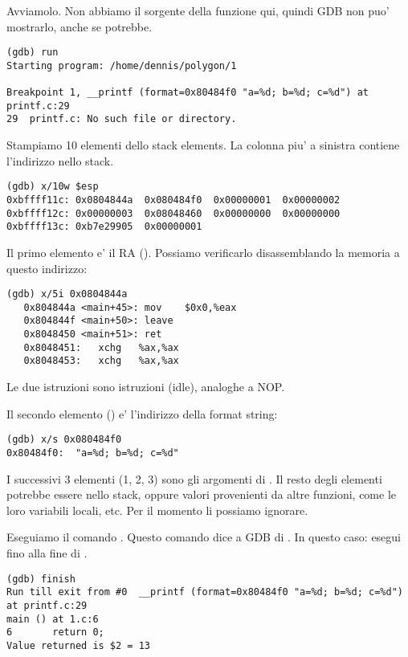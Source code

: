 Avviamolo.
Non abbiamo il sorgente della funzione \printf qui, quindi \ac{GDB} non puo' mostrarlo, anche se potrebbe.

\begin{lstlisting}
(gdb) run
Starting program: /home/dennis/polygon/1 

Breakpoint 1, __printf (format=0x80484f0 "a=%d; b=%d; c=%d") at printf.c:29
29	printf.c: No such file or directory.
\end{lstlisting}

Stampiamo 10 elementi dello stack elements. La colonna piu' a sinistra contiene l'indirizzo nello stack.

\begin{lstlisting}
(gdb) x/10w $esp
0xbffff11c:	0x0804844a	0x080484f0	0x00000001	0x00000002
0xbffff12c:	0x00000003	0x08048460	0x00000000	0x00000000
0xbffff13c:	0xb7e29905	0x00000001
\end{lstlisting}

Il primo elemento e' il \ac{RA} ().
Possiamo verificarlo disassemblando la memoria a questo indirizzo:

\begin{lstlisting}[label=NOP_as_XCHG_example,style=customasmx86]
(gdb) x/5i 0x0804844a
   0x804844a <main+45>:	mov    $0x0,%eax
   0x804844f <main+50>:	leave  
   0x8048450 <main+51>:	ret    
   0x8048451:	xchg   %ax,%ax
   0x8048453:	xchg   %ax,%ax
\end{lstlisting}

Le due istruzioni  sono istruzioni  (idle), analoghe a \ac{NOP}.

Il secondo elemento () e' l'indirizzo della format string:

\begin{lstlisting}
(gdb) x/s 0x080484f0
0x80484f0:	"a=%d; b=%d; c=%d"
\end{lstlisting}

I successivi 3 elementi (1, 2, 3) sono gli argomenti di \printf.
Il resto degli elementi potrebbe essere  nello stack, oppure valori provenienti da altre funzioni, come le loro variabili locali, etc.
Per il momento li possiamo ignorare.

Eseguiamo il comando . 
Questo comando dice a GDB di .
In questo caso: esegui fino alla fine di \printf.

\begin{lstlisting}
(gdb) finish
Run till exit from #0  __printf (format=0x80484f0 "a=%d; b=%d; c=%d") at printf.c:29
main () at 1.c:6
6		return 0;
Value returned is $2 = 13
\end{lstlisting}

